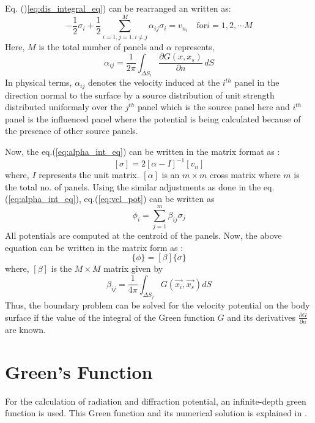 Eq. ()\ref{eq:dis_integral_eq}) can be rearranged an written as:
\begin{equation}
    \label{eq:alpha_int_eq}
    -\frac{1}{2}\sigma_i + \frac{1}{2}\sum_{i=1, j=1, i\ne j}^{M}\alpha_{ij}\sigma_i = v_{n_i} \quad \text{for} i = 1, 2, \cdots M
\end{equation}
Here, $M$ is the total number of panels and $\alpha$ represents, 
\begin{equation}
    \label{eq:alpha}
    \alpha_{ij} = \frac{1}{2\pi}\int_{\Delta S_i}\frac{\partial G(x, x_s)}{\partial n} \,dS
\end{equation}
In physical terms, $\alpha_{ij}$ denotes the velocity induced at the $i^{th}$ panel in the direction normal to the surface by a source distribution of unit strength distributed uniformaly over the $j^{th}$ panel which is the source panel here and $i^{th}$ panel is the influenced panel where the potential is being calculated because of the presence of other source panels.

Now, the eq.(\ref{eq:alpha_int_eq}) can be written in the matrix format as :
\begin{equation}
    \label{eq:sigma_alpha}
    [\sigma] = 2[\alpha - I]^{-1}[v_n]
\end{equation}
where, $I$ represents the unit matrix. $[\alpha]$ is an $m\times m$ cross matrix where $m$ is the total no. of panels. Using the similar adjustments as done in the eq.(\ref{eq:alpha_int_eq}), eq.(\ref{eq:vel_pot}) can be written as
\begin{equation}
    \phi_i = \sum_{j=1}^{m}\beta_{ij}\sigma_{j}
\end{equation}
All potentials are computed at the centroid of the panels. Now, the above equation can be written in the matrix form as :
\begin{equation}
    \{\phi\} = [\beta]\{\sigma\}
\end{equation}
where, $[\beta]$ is the $M\times M$ matrix given by
\begin{equation}
    \label{eq:beta_eq}
    \beta_{ij} = \frac{1}{4\pi}\int_{\Delta S_j}G(\Vec{x_i}, \vec{x_s}) dS  
\end{equation}
Thus, the boundary problem can be solved for the velocity potential on the body surface if the value of the integral of the Green function $G$ and its derivatives $\frac{\partial G}{\partial n}$ are known.
\section{Green's Function}
\label{sec:green_fun}
For the calculation of radiation and diffraction potential, an infinite-depth green function is used. This Green function and its numerical solution is explained in \cite{telste1986numerical}. 

